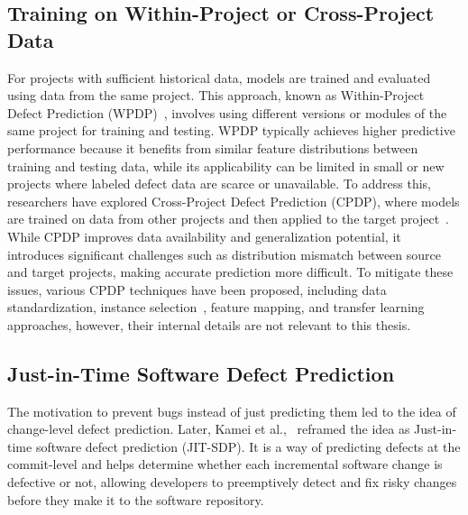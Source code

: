 \documentclass[\main/thesis.tex]{subfiles}
\begin{document}

\subsection{Training on Within-Project or Cross-Project Data}
For projects with sufficient historical data, models are trained and evaluated using data from the same project. This approach, known as Within-Project Defect Prediction (WPDP)~\cite{turhan2009relative,basili1996}, involves using different versions or modules of the same project for training and testing. 
WPDP typically achieves higher predictive performance because it benefits from similar feature distributions between training and testing data, while its applicability can be limited in small or new projects where labeled defect data are scarce or unavailable. To address this, researchers have explored Cross-Project Defect Prediction (CPDP), where models are trained on data from other projects and then applied to the target project~\cite{zimmermann2009cross,he2012investigation}. While CPDP improves data availability and generalization potential, it introduces significant challenges such as distribution mismatch between source and target projects, making accurate prediction more difficult. To mitigate these issues, various CPDP techniques have been proposed, including data standardization, instance selection~\cite{menzies2013better}, feature mapping, and transfer learning~\cite{nam2013transfer} approaches, however, their internal details are not relevant to this thesis. 


\subsection{Just-in-Time Software Defect Prediction} 
The motivation to prevent bugs instead of just predicting them led to the idea of change-level defect prediction. Later, Kamei et al.,~\cite{kamei2012large} reframed the idea as Just-in-time software defect prediction (JIT-SDP). It is a way of predicting defects at the commit-level and helps determine whether each incremental software change is defective or not, allowing developers to preemptively detect and fix risky changes before they make it to the software repository.
\end{document}
